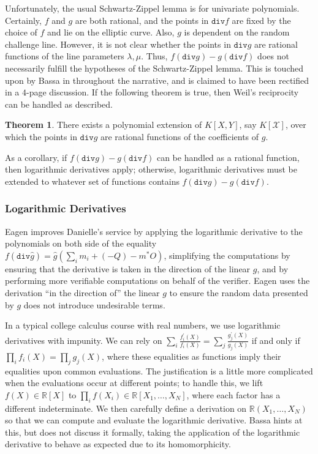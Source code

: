 \documentclass{article}
\theoremstyle{definition}
\newtheorem{theorem}{Theorem}
\newcommand{\6}{\mathbf}
\newcommand{\7}{\mathcal}
\begin{document}
Unfortunately, the usual Schwartz-Zippel lemma is for univariate polynomials. Certainly, $f$ and $g$ are both rational, and the points in $\texttt{div}f$ are fixed by the choice of $f$ and lie on the elliptic curve. Also, $g$ is dependent on the random challenge line. However, it is not clear whether the points in $\texttt{div}g$ are rational functions of the line parameters $\lambda, \mu$. Thus, $f(\texttt{div}g) - g(\texttt{div}f)$ does not necessarily fulfill the hypotheses of the Schwartz-Zippel lemma. This is touched upon by Bassa in \cite{BassaSoundnessProofSoP} throughout the narrative, and is claimed to have been rectified in a $4$-page discussion.
If the following theorem is true, then Weil's reciprocity can be handled as described. 
\begin{theorem}
There exists a polynomial extension of $K[X,Y]$, say $K[\mathcal{X}]$, over which the points in $\texttt{div}g$ are rational functions of the coefficients of $g$.
\end{theorem}
As a corollary, if $f(\texttt{div}g)-g(\texttt{div}f)$ can be handled as a rational function, then logarithmic derivatives apply; otherwise, logarithmic derivatives must be extended to whatever set of functions contains $f(\texttt{div}g)-g(\texttt{div}f)$.

\subsubsection{Logarithmic Derivatives}

Eagen improves Danielle's service by applying the logarithmic derivative to the polynomials on both side of the equality $f(\texttt{div}\widehat{g})=\widehat{g}(\sum_i m_i + (-Q) - m^*O)$, simplifying the computations by ensuring that the derivative is taken in the direction of the linear $g$, and by performing more verifiable computations on behalf of the verifier. Eagen uses the derivation  ``in the direction of'' the linear $g$ to ensure the random data presented by $g$ does not introduce undesirable terms.

In a typical college calculus course with real numbers, we use logarithmic derivatives with impunity. We can rely on $\sum_i \frac{f^\prime_i(X)}{f_i(X)} = \sum_j \frac{g^\prime_j(X)}{g_j(X)}$ if and only if $\prod_i f_i(X) = \prod_j g_j(X)$, where these equalities as functions imply their equalities upon common evaluations. The justification is a little more complicated when the evaluations occur at different points; to handle this, we lift $f(X) \in \mathbb{R}[X]$ to $\prod_i f(X_i) \in \mathbb{R}[X_1, \ldots, X_N]$, where each factor has a different indeterminate. We then carefully define a derivation on $\mathbb{R}(X_1, \ldots, X_N)$ so that we can compute and evaluate the logarithmic derivative. Bassa hints at this, but does not discuss it formally, taking the application of the logarithmic derivative to behave as expected due to its homomorphicity.
\end{document}
